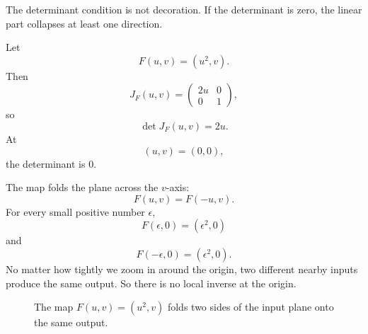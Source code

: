 The determinant condition is not decoration.  If the determinant is zero, the linear part
collapses at least one direction.

\begin{example}
Let
\[
    F(u,v)=(u^2,v).
\]
Then
\[
    J_F(u,v)
    =
    \begin{pmatrix}
        2u & 0\\
        0 & 1
    \end{pmatrix},
\]
so
\[
    \det J_F(u,v)=2u.
\]
At
\[
    (u,v)=(0,0),
\]
the determinant is \(0\).

The map folds the plane across the \(v\)-axis:
\[
    F(u,v)=F(-u,v).
\]
For every small positive number \(\epsilon\),
\[
    F(\epsilon,0)=(\epsilon^2,0)
\]
and
\[
    F(-\epsilon,0)=(\epsilon^2,0).
\]
No matter how tightly we zoom in around the origin, two different nearby inputs produce
the same output.  So there is no local inverse at the origin.
\end{example}

\begin{figure}[h]
\centering
{}
\caption{The map \(F(u,v)=(u^2,v)\) folds two sides of the input plane onto the same
output.}
\end{figure}


